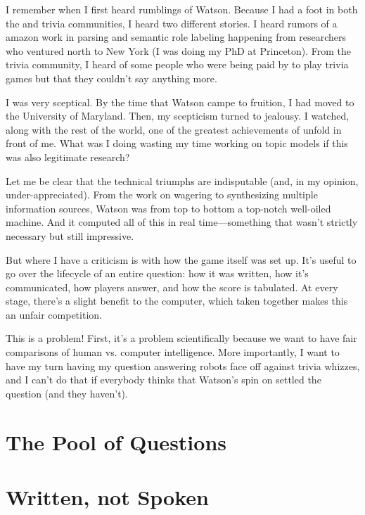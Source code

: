 


I remember when I first heard rumblings of Watson.
%
Because I had a foot in both the  and trivia communities, I heard two different stories.
%
I heard rumors of a amazon work in parsing and semantic role labeling happening from researchers who ventured north to New York (I was doing my PhD at Princeton).
%
From the trivia community, I heard of some people who were being paid by  to play trivia games but that they couldn't say anything more.

I was very sceptical.
%
By the time that Watson campe to fruition, I had moved to the University of Maryland.
%
Then, my scepticism turned to jealousy.
%
I watched, along with the rest of the world, one of the greatest achievements of  unfold in front of me.
%
What was I doing wasting my time working on topic models if this was also legitimate research?

Let me be clear that the technical triumphs are indisputable (and, in my opinion, under-appreciated).
%
From the work on wagering to synthesizing multiple information sources, Watson was from top to bottom a top-notch well-oiled machine.
%
And it computed all of this in real time---something that wasn't strictly necessary but still impressive.

But where I have a criticism is with how the game itself was set up.
%
It's useful to go over the lifecycle of an entire question: how it was written, how it's communicated, how players answer, and how the score is tabulated.
%
At every stage, there's a slight benefit to the computer, which taken together makes this an unfair competition.

This is a problem!  First, it's a problem scientifically because we want to have fair comparisons of human vs. computer intelligence.
%
More importantly, I want to have my turn having my question answering robots face off against trivia whizzes, and I can't do that if everybody thinks that Watson's spin on \jeopardy{} settled the question (and they haven't).

\section{The Pool of Questions}



\section{Written, not Spoken}

